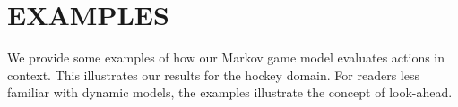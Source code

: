 %









\section{EXAMPLES} 
We provide some examples of how our Markov game model evaluates actions in context. This illustrates our results for the hockey domain. For readers less familiar with dynamic models, the examples illustrate the concept of look-ahead.

